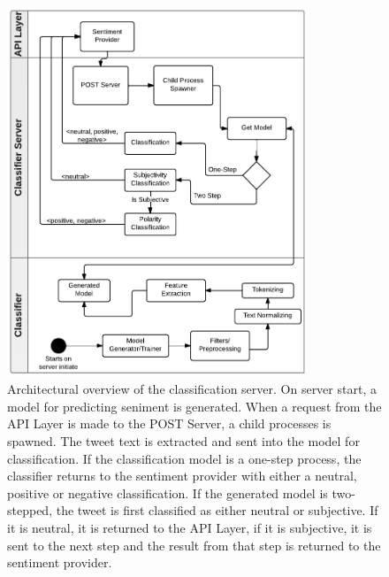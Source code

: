 \begin{figure}[htb]
 \begin{center}
     \includegraphics[width=0.8\textwidth]{../img/ClassifierArcitechture30.pdf}
 \end{center}
 \caption[Architectural overview of the classification server.]{Architectural overview of the classification server. On server start, a model for predicting seniment is generated. When a request from the API Layer is made to the POST Server, a child processes is spawned. The tweet text is extracted and sent into the model for classification. If the classification model is a one-step process, the classifier returns to the sentiment provider with either a neutral, positive or negative classification. If the generated model is two-stepped, the tweet is first classified as either neutral or subjective. If it is neutral, it is returned to the API Layer, if it is subjective, it is sent to the next step and the result from that step is returned to the sentiment provider.}
 \label{fig:ClassifierArcitechture}
\end{figure}

